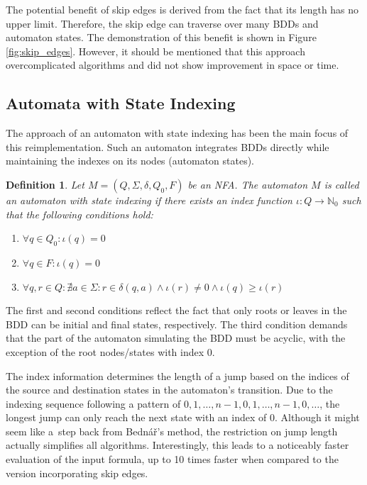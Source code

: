 \documentclass[pdflatex,sn-mathphys-num]{sn-jnl}%
\theoremstyle{thmstyleone}%
\theoremstyle{thmstyletwo}%
\theoremstyle{thmstylethree}%
\newtheorem{definition}{Definition}%
\begin{document}
        The potential benefit of skip edges is derived from the fact that its length has no upper limit. Therefore, the skip edge can traverse over many BDDs and automaton states. The demonstration of this benefit is shown in Figure \ref{fig:skip_edges}. However, it should be mentioned that this approach overcomplicated algorithms and did not show improvement in space or time.


    \subsection{Automata with State Indexing}
        The approach of an automaton with state indexing has been the main focus of this reimplementation. Such an automaton integrates BDDs directly while maintaining the indexes on its nodes (automaton states).

        \vspace*{0.5em}

        \begin{definition}
            Let $M = (Q, \Sigma, \delta, Q_0, F)$ be an NFA. The automaton $M$ is called an automaton with state indexing if there exists an index function $\iota : Q \rightarrow \mathbb{N}_0$ such that the following conditions hold:
            \begin{enumerate}[noindent]
                \item $\forall q \in Q_0 : \iota(q) = 0$
                \item $\forall q \in F : \iota(q) = 0$
                \item $\forall q, r \in Q : \nexists a \in \Sigma : r \in \delta(q, a) \land \iota(r) \neq 0 \land \iota(q) \geq \iota(r)$
            \end{enumerate}
        \end{definition}

        The first and second conditions reflect the fact that only roots or leaves in the BDD can be initial and final states, respectively. The third condition demands that the part of the automaton simulating the BDD must be acyclic, with the exception of the root nodes/states with index 0.

        The index information determines the length of a jump based on the indices of the source and destination states in the automaton's transition. Due to the indexing sequence following a pattern of $0, 1, \dots, n-1, 0, 1, \dots, n-1, 0, \dots$, the longest jump can only reach the next state with an index of $0$. Although it might seem like a~step back from Bednář's method, the restriction on jump length actually simplifies all algorithms. Interestingly, this leads to a noticeably faster evaluation of the input formula, up to 10 times faster when compared to the version incorporating skip edges.
\end{document}
